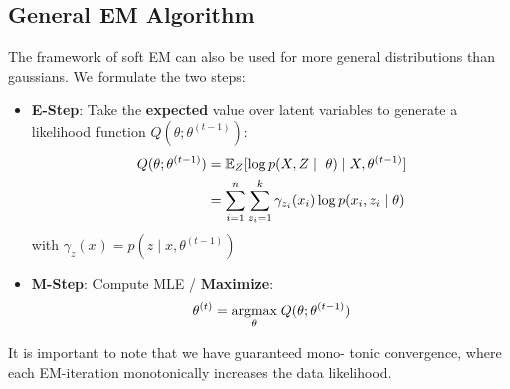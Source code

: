 \subsection{General EM Algorithm}

The framework of soft EM can also be used for more general distributions than gaussians. We formulate the two steps:
\begin{itemize}
	\item \textbf{E-Step}: Take the \textbf{expected} value over latent variables to generate a likelihood function $Q(\theta ; \theta^{(t-1)})$:
		\begin{align*}
			Q(\theta ; \theta^{(t-1)}) &= \E_{Z}[ \log  p(X, Z \; | \; \theta) \; | \; X, \theta^{(t-1)}] \\
			&= \sum_{i=1}^n \sum_{z_i=1}^k \gamma_{z_i}(x_i) \log p(x_i, z_i \; | \; \theta)
		\end{align*}
		with $\gamma_z(x) = p(z \; | \; x, \theta^{(t-1)})$
	\item \textbf{M-Step}: Compute MLE / \textbf{Maximize}:
		$$\theta^{(t)} = \underset{\theta}{\text{argmax}} \; Q(\theta; \theta^{(t-1)})$$
\end{itemize}

It is important to note that we have guaranteed mono- tonic convergence, where each EM-iteration monotonically increases the data likelihood.
